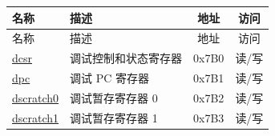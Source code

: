 
\begin{longtable}{ | p{4.0cm} | p{8.4cm} | c | c| }
\hline\rowcolor{lightgray}
名称 & 描述 & 地址 & 访问 \\ \hline
\endfirsthead
\hline
\rowcolor{lightgray}
名称 & 描述 & 地址 & 访问 \\ \hline

\endhead
\endfoot

\hyperref[regdesc:DCSR]{dcsr} & 调试控制和状态寄存器  & 0x7B0 & 读/写 \\\hline
\hyperref[regdesc:DPC]{dpc} & 调试 PC 寄存器 & 0x7B1 & 读/写 \\\hline
\hyperref[regdesc:DSCRATCH0]{dscratch0} & 调试暂存寄存器 0 & 0x7B2 & 读/写 \\\hline
\hyperref[regdesc:DSCRATCH1]{dscratch1} & 调试暂存寄存器 1 & 0x7B3 & 读/写 \\\hline
\end{longtable}
